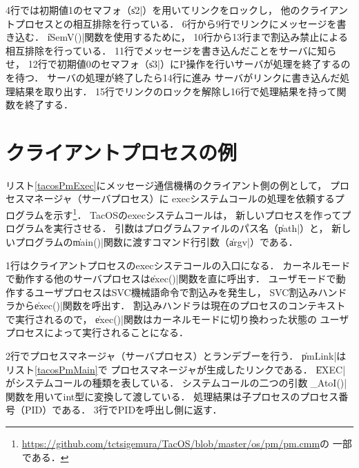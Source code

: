 

4行では初期値1のセマフォ（\|s2|）を用いてリンクをロックし，
他のクライアントプロセスとの相互排除を行っている．
6行から9行でリンクにメッセージを書き込む．
\|iSemV()|関数を使用するために，
10行から13行まで割込み禁止による相互排除を行っている．
11行でメッセージを書き込んだことをサーバに知らせ，
12行で初期値0のセマフォ（\|s3|）にP操作を行いサーバが処理を終了するのを待つ．
サーバの処理が終了したら14行に進み
サーバがリンクに書き込んだ処理結果を取り出す．
15行でリンクのロックを解除し16行で処理結果を持って関数を終了する．

\section{クライアントプロセスの例}
リスト\ref{tacosPmExec}にメッセージ通信機構のクライアント側の例として，
プロセスマネージャ（サーバプロセス）に
execシステムコールの処理を依頼するプログラムを示す\footnote{
  \url{https://github.com/tctsigemura/TacOS/blob/master/os/pm/pm.cmm}の
  一部である．}．
TacOSのexecシステムコールは，
新しいプロセスを作ってプログラムを実行させる．
引数はプログラムファイルのパス名（\|path|）と，
新しいプログラムの\|main()|関数に渡すコマンド行引数（\|argv|）である．



1行はクライアントプロセスのexecシステコールの入口になる．
カーネルモードで動作する他のサーバプロセスは\|exec()|関数を直に呼出す．
ユーザモードで動作するユーザプロセスはSVC機械語命令で割込みを発生し，
SVC割込みハンドラから\|exec()|関数を呼出す．
割込みハンドラは現在のプロセスのコンテキストで実行されるので，
\|exec()|関数はカーネルモードに切り換わった状態の
ユーザプロセスによって実行されることになる．

2行でプロセスマネージャ（サーバプロセス）とランデブーを行う．
\|pmLink|はリスト\ref{tacosPmMain}で
プロセスマネージャが生成したリンクである．
\|EXEC|がシステムコールの種類を表している．
システムコールの二つの引数は\|_AtoI()|関数を用いてint型に変換して渡している．
処理結果は子プロセスのプロセス番号（PID）である．
3行でPIDを呼出し側に返す．


